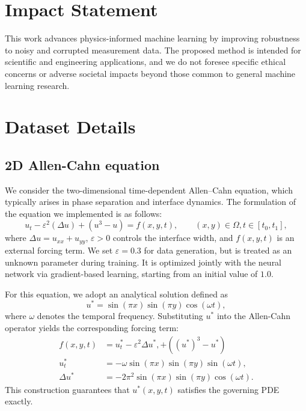 \documentclass{article}
\theoremstyle{plain}
\theoremstyle{definition}
\theoremstyle{remark}
\begin{document}
\section*{Impact Statement}

This work advances physics-informed machine learning by improving robustness to noisy and corrupted measurement data. The proposed method is intended for scientific and engineering applications, and we do not foresee specific ethical concerns or adverse societal impacts beyond those common to general machine learning research.

\nocite{langley00}




\newpage
\appendix
\onecolumn

\section{Dataset Details}
\label{appendix:DatasetDetails}

\subsection{2D Allen-Cahn equation}

We consider the two-dimensional time-dependent Allen--Cahn equation, which typically arises in phase separation and interface dynamics. The formulation of the equation we implemented is as follows:
\begin{equation}
u_t - \varepsilon^2 (\Delta u) + (u^3 - u) = f(x,y,t),
\qquad (x,y) \in \Omega, t \in [t_0, t_1],
\end{equation}
where $\Delta u = u_{xx} + u_{yy}$, $\varepsilon > 0$ controls the interface width, and $f(x,y,t)$ is an external forcing term. We set $\varepsilon = 0.3$ for data generation, but is treated as an unknown parameter during training. It is optimized jointly with the neural network via gradient-based learning, starting from an initial value of $1.0$.

For this equation, we adopt an analytical solution defined as
\begin{equation}
u^* = \sin(\pi x) \sin(\pi y) \cos(\omega t),
\end{equation}
where $\omega$ denotes the temporal frequency. Substituting $u^*$ into the Allen-Cahn operator yields the corresponding forcing term:
\begin{align}
f(x,y,t) &= u^*_t - \varepsilon^2 \Delta u^*, + ((u^*)^3-u^*)\\
u^*_t &= -\omega \sin(\pi x) \sin(\pi y) \sin(\omega t), \\
\Delta u^* &= -2 \pi^2 \sin(\pi x) \sin(\pi y) \cos(\omega t).
\end{align}
This construction guarantees that $u^*(x,y,t)$ satisfies the governing PDE exactly.
\end{document}
